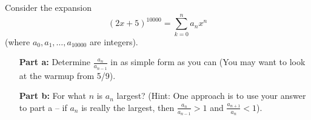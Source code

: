 \documentclass[11pt]{amsart}
\begin{document}
 
\begin{problem}

Consider the expansion 
$$(2x+5)^{10000} = \sum_{k=0}^n a_n x^n$$
(where $a_0, a_1, \dots, a_{10000}$ are integers).
\begin{itemize}
	\item[\textbf{Part a:}]{} Determine $\frac{a_n}{a_{n-1}}$ in as simple form as you can (You may want to look at the warmup from 5/9).
	\item[\textbf{Part b:}]{} For what $n$ is $a_n$ largest?  (Hint: One approach is to use your answer to part a -- if $a_n$ is really the largest, then $\frac{a_n}{a_{n-1}}>1$ and $\frac{a_{n+1}}{a_n}<1$).
\end{itemize}
\end{problem}
\end{document}
